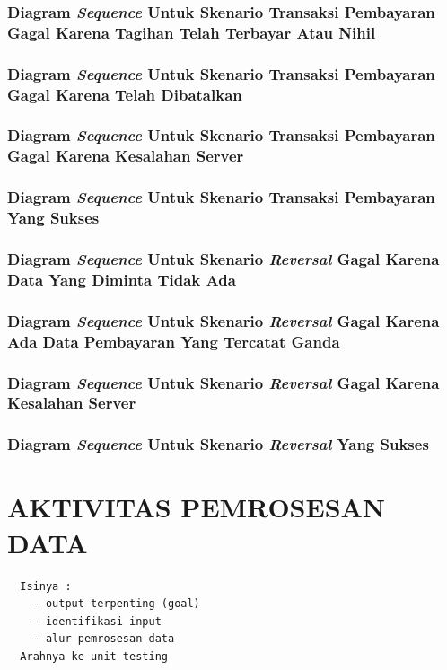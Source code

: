 \documentclass[pdftex,12pt, oneside]{article}
\begin{document}
\subsubsection{Diagram \textit{Sequence} Untuk Skenario Transaksi Pembayaran Gagal Karena Tagihan Telah Terbayar Atau Nihil}
\subsubsection{Diagram \textit{Sequence} Untuk Skenario Transaksi Pembayaran Gagal Karena Telah Dibatalkan}
\subsubsection{Diagram \textit{Sequence} Untuk Skenario Transaksi Pembayaran Gagal Karena Kesalahan Server}
\subsubsection{Diagram \textit{Sequence} Untuk Skenario Transaksi Pembayaran Yang Sukses}
\subsubsection{Diagram \textit{Sequence} Untuk Skenario \textit{Reversal} Gagal Karena Data Yang Diminta Tidak Ada}
\subsubsection{Diagram \textit{Sequence} Untuk Skenario \textit{Reversal} Gagal Karena Ada Data Pembayaran Yang Tercatat Ganda}
\subsubsection{Diagram \textit{Sequence} Untuk Skenario \textit{Reversal} Gagal Karena Kesalahan Server}
\subsubsection{Diagram \textit{Sequence} Untuk Skenario \textit{Reversal} Yang Sukses}


\section{AKTIVITAS PEMROSESAN DATA}

\begin{verbatim}
  Isinya :
    - output terpenting (goal)
    - identifikasi input 
    - alur pemrosesan data
  Arahnya ke unit testing
\end{verbatim}
\end{document}

